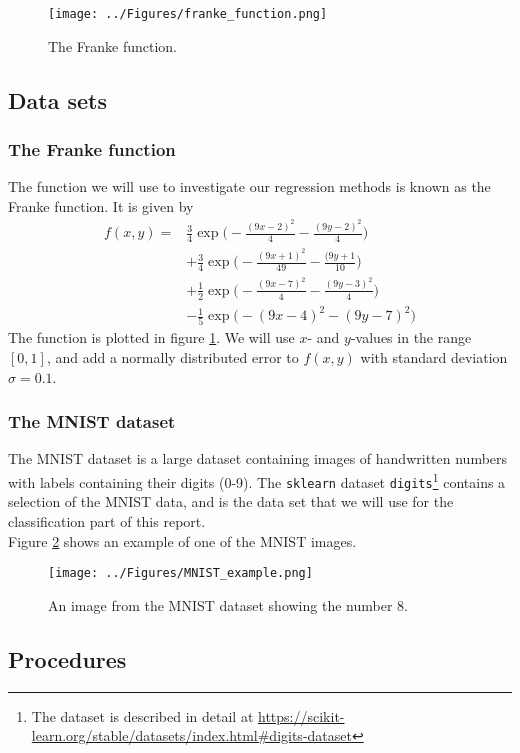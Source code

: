 \documentclass[notitlepage, reprint, nofootinbib]{revtex4-1}
\begin{document}
\begin{figure}[h!]
	\centering
	\texttt{[image: ../Figures/franke\_function.png]}
	\caption{The Franke function.}
	\label{franke}
\end{figure}
\subsection{Data sets}
\subsubsection{The Franke function}
The function we will use to investigate our regression methods is known as the Franke function. It is given by 
\begin{align}
	f(x,y)=&\frac{3}{4}\exp\Big(-\frac{(9x-2)^2}{4}-\frac{(9y-2)^2}{4}\Big)\nonumber\\
	&+\frac{3}{4}\exp\Big(-\frac{(9x+1)^2}{49}-\frac{(9y+1}{10}\Big)\nonumber\\
	&+\frac{1}{2}\exp\Big(-\frac{(9x-7)^2}{4}-\frac{(9y-3)^2}{4}\Big)\nonumber\\
	&-\frac{1}{5}\exp\Big(-(9x-4)^2-(9y-7)^2\Big)
\end{align} 
The function is plotted in figure \ref{franke}. We will use $x$- and $y$-values in the range $[0,1]$, and add a normally distributed error to $f(x,y)$ with standard deviation $\sigma=0.1$.

\subsubsection{The MNIST dataset}
The MNIST dataset is a large dataset containing images of handwritten numbers with labels containing their digits (0-9). The \texttt{sklearn} dataset \texttt{digits}\footnote{The dataset is described in detail at \url{https://scikit-learn.org/stable/datasets/index.html\#digits-dataset}} contains a selection of the MNIST data, and is the data set that we will use for the classification part of this report. \\[2mm]
Figure \ref{MNIST_example} shows an example of one of the MNIST images. 
\begin{figure}
	\centering
	\texttt{[image: ../Figures/MNIST\_example.png]}
	\caption{An image from the MNIST dataset showing the number 8. }
	\label{MNIST_example}
\end{figure}

\subsection{Procedures}
\end{document}
